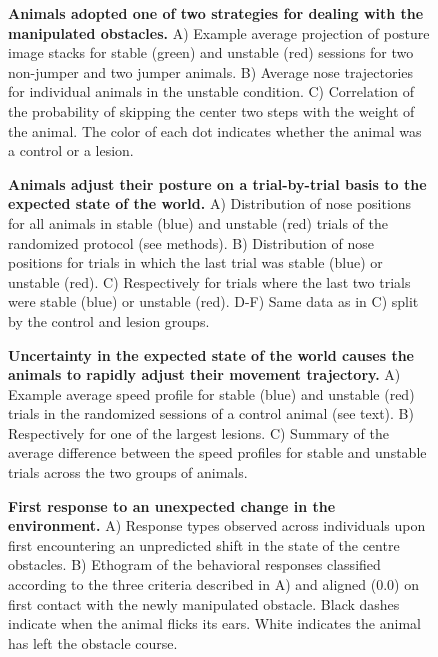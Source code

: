 \begin{figure}
\centering

\caption{\textbf{Animals adopted one of two strategies for dealing with the manipulated obstacles.} A) Example average projection of posture image stacks for stable (green) and unstable (red) sessions for two non-jumper and two jumper animals. B) Average nose trajectories for individual animals in the unstable condition. C) Correlation of the probability of skipping the center two steps with the weight of the animal. The color of each dot indicates whether the animal was a control or a lesion.}
\label{fig:jumping}
\end{figure}

\begin{figure}
\centering

\caption{\textbf{Animals adjust their posture on a trial-by-trial basis to the expected state of the world.} A) Distribution of nose positions for all animals in stable (blue) and unstable (red) trials of the randomized protocol (see methods). B) Distribution of nose positions for trials in which the last trial was stable (blue) or unstable (red). C) Respectively for trials where the last two trials were stable (blue) or unstable (red). D-F) Same data as in C) split by the control and lesion groups.}
\label{fig:random}
\end{figure}

\begin{figure}
\centering

\caption{\textbf{Uncertainty in the expected state of the world causes the animals to rapidly adjust their movement trajectory.} A) Example average speed profile for stable (blue) and unstable (red) trials in the randomized sessions of a control animal (see text). B) Respectively for one of the largest lesions. C) Summary of the average difference between the speed profiles for stable and unstable trials across the two groups of animals.}
\label{fig:speed}
\end{figure}

\begin{figure}
\centering

\caption{\textbf{First response to an unexpected change in the environment.} A) Response types observed across individuals upon first encountering an unpredicted shift in the state of the centre obstacles. B) Ethogram of the behavioral responses classified according to the three criteria described in A) and aligned (0.0) on first contact with the newly manipulated obstacle. Black dashes indicate when the animal flicks its ears. White indicates the animal has left the obstacle course.}
\label{fig:ethogram}
\end{figure}
